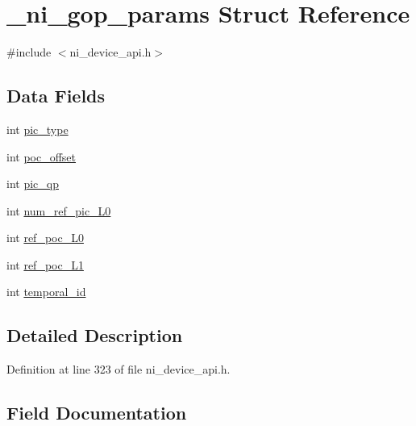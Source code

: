\hypertarget{struct__ni__gop__params}{}\section{\+\_\+ni\+\_\+gop\+\_\+params Struct Reference}
\label{struct__ni__gop__params}


{\ttfamily \#include $<$ni\+\_\+device\+\_\+api.\+h$>$}

\subsection*{Data Fields}
\begin{DoxyCompactItemize}
\item 
int \mbox{\hyperlink{struct__ni__gop__params_adda1e53e75bb6a22b7b63a8972f3403a}{pic\+\_\+type}}
\item 
int \mbox{\hyperlink{struct__ni__gop__params_a78bb26bb9ca9c0b36f464ccecd5a2082}{poc\+\_\+offset}}
\item 
int \mbox{\hyperlink{struct__ni__gop__params_a6e2a5882f0b5e624921d041f5e2822cb}{pic\+\_\+qp}}
\item 
int \mbox{\hyperlink{struct__ni__gop__params_a6eb557619f61c6b3b4e69c7931ba3b80}{num\+\_\+ref\+\_\+pic\+\_\+\+L0}}
\item 
int \mbox{\hyperlink{struct__ni__gop__params_a65a17d11c1bb6266ef249d85a9c3af67}{ref\+\_\+poc\+\_\+\+L0}}
\item 
int \mbox{\hyperlink{struct__ni__gop__params_ad4dc226bc0b6da8e4a82fbc49f52b755}{ref\+\_\+poc\+\_\+\+L1}}
\item 
int \mbox{\hyperlink{struct__ni__gop__params_ac5ddfc6b85761655c1f00e9364aa9f0f}{temporal\+\_\+id}}
\end{DoxyCompactItemize}


\subsection{Detailed Description}


Definition at line 323 of file ni\+\_\+device\+\_\+api.\+h.



\subsection{Field Documentation}
\mbox{\label{struct__ni__gop__params_a6eb557619f61c6b3b4e69c7931ba3b80}} 

